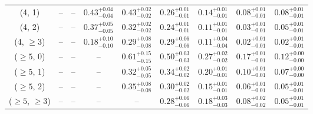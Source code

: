 \begin{table}[h!]
{\begin{tabular}{ccccccccc}
	(4, 1) & -- & -- & $0.43^{+ 0.04 }_{- 0.04 }$ & $0.43^{+ 0.02 }_{- 0.02 }$ & $0.26^{+ 0.01 }_{- 0.01 }$ & $0.14^{+ 0.01 }_{- 0.01 }$ & $0.08^{+ 0.01 }_{- 0.01 }$ & $0.08^{+ 0.01 }_{- 0.01 }$ \\[0.5ex] 
	(4, 2) & -- & -- & $0.37^{+ 0.05 }_{- 0.05 }$ & $0.32^{+ 0.02 }_{- 0.02 }$ & $0.24^{+ 0.01 }_{- 0.01 }$ & $0.11^{+ 0.01 }_{- 0.01 }$ & $0.03^{+ 0.01 }_{- 0.01 }$ & $0.05^{+ 0.01 }_{- 0.01 }$ \\[0.5ex] 
	(4, $\ge3$) & -- & -- & $0.18^{+ 0.10 }_{- 0.10 }$ & $0.29^{+ 0.08 }_{- 0.08 }$ & $0.29^{+ 0.06 }_{- 0.06 }$ & $0.11^{+ 0.04 }_{- 0.04 }$ & $0.02^{+ 0.01 }_{- 0.01 }$ & $0.02^{+ 0.01 }_{- 0.01 }$ \\[0.5ex] 
	($\ge5$, 0) & -- & -- & -- & $0.61^{+ 0.15 }_{- 0.15 }$ & $0.50^{+ 0.03 }_{- 0.03 }$ & $0.27^{+ 0.02 }_{- 0.02 }$ & $0.17^{+ 0.01 }_{- 0.01 }$ & $0.12^{+ 0.00 }_{- 0.00 }$ \\[0.5ex] 
	($\ge5$, 1) & -- & -- & -- & $0.32^{+ 0.05 }_{- 0.05 }$ & $0.34^{+ 0.02 }_{- 0.02 }$ & $0.20^{+ 0.01 }_{- 0.01 }$ & $0.10^{+ 0.01 }_{- 0.01 }$ & $0.07^{+ 0.00 }_{- 0.00 }$ \\[0.5ex] 
	($\ge5$, 2) & -- & -- & -- & $0.35^{+ 0.08 }_{- 0.08 }$ & $0.30^{+ 0.02 }_{- 0.02 }$ & $0.15^{+ 0.01 }_{- 0.01 }$ & $0.06^{+ 0.01 }_{- 0.01 }$ & $0.05^{+ 0.01 }_{- 0.01 }$ \\[0.5ex] 
	($\ge5$, $\ge3$) & -- & -- & -- & -- & $0.28^{+ 0.06 }_{- 0.06 }$ & $0.18^{+ 0.03 }_{- 0.03 }$ & $0.08^{+ 0.02 }_{- 0.02 }$ & $0.05^{+ 0.01 }_{- 0.01 }$ \\[0.5ex] 
	\hline
	\hline
\end{tabular}}
\end{table}
